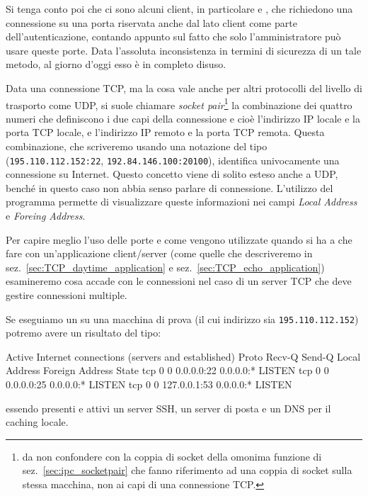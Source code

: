 Si tenga conto poi che ci sono alcuni client, in particolare  e
, che richiedono una connessione su una porta riservata anche dal
lato client come parte dell'autenticazione, contando appunto sul fatto che
solo l'amministratore può usare queste porte. Data l'assoluta inconsistenza in
termini di sicurezza di un tale metodo, al giorno d'oggi esso è in completo
disuso.

Data una connessione TCP, ma la cosa vale anche per altri protocolli del
livello di trasporto come UDP, si suole chiamare 
\textit{socket pair}\footnote{da non confondere con la coppia di socket della
  omonima funzione  di sez.~\ref{sec:ipc_socketpair} che
  fanno riferimento ad una coppia di socket sulla stessa macchina, non ai capi
  di una connessione TCP.} la combinazione dei quattro numeri che definiscono
i due capi della connessione e cioè l'indirizzo IP locale e la porta TCP
locale, e l'indirizzo IP remoto e la porta TCP remota.  Questa combinazione,
che scriveremo usando una notazione del tipo (\texttt{195.110.112.152:22},
\texttt{192.84.146.100:20100}), identifica univocamente una connessione su
Internet.  Questo concetto viene di solito esteso anche a UDP, benché in
questo caso non abbia senso parlare di connessione. L'utilizzo del programma
 permette di visualizzare queste informazioni nei campi
\textit{Local Address} e \textit{Foreing Address}.

Per capire meglio l'uso delle porte e come vengono utilizzate quando si ha a
che fare con un'applicazione client/server (come quelle che descriveremo in
sez.~\ref{sec:TCP_daytime_application} e sez.~\ref{sec:TCP_echo_application})
esamineremo cosa accade con le connessioni nel caso di un server TCP che deve
gestire connessioni multiple.

Se eseguiamo un  su una macchina di prova (il cui indirizzo sia
\texttt{195.110.112.152}) potremo avere un risultato del tipo:
\begin{Terminal}
Active Internet connections (servers and established)
Proto Recv-Q Send-Q Local Address           Foreign Address         State      
tcp        0      0 0.0.0.0:22              0.0.0.0:*               LISTEN
tcp        0      0 0.0.0.0:25              0.0.0.0:*               LISTEN
tcp        0      0 127.0.0.1:53            0.0.0.0:*               LISTEN
\end{Terminal}
essendo presenti e attivi un server SSH, un server di posta e un DNS per il
caching locale.

